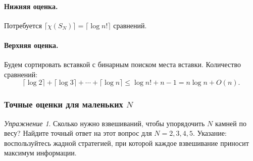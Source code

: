 \documentclass[12pt]{article}
\theoremstyle{definition}
\theoremstyle{plain}
\theoremstyle{remark}
\newtheorem{exercise}{Упражнение}[section]
\begin{document}
\paragraph{Нижняя оценка.} Потребуется \(\lceil\chi(S_N)\rceil = \lceil\log n!\rceil\) сравнений.  

\paragraph{Верхняя оценка.} Будем сортировать вставкой с бинарным поиском места вставки. Количество сравнений:
\[
\lceil\log 2\rceil + \lceil\log 3\rceil +\dotsb+ \lceil\log n\rceil \le \log n! + n - 1 = n\log n + O(n).
\]

\subsubsection{Точные оценки для маленьких $N$}
\begin{exercise}
Сколько нужно взвешиваний, чтобы упорядочить \(N\) камней по весу? 
Найдите точный ответ на этот вопрос для \(N = 2, 3, 4, 5\). Указание: воспользуйтесь жадной стратегией, при которой каждое взвешивание приносит максимум информации.
\end{exercise}
\end{document}
